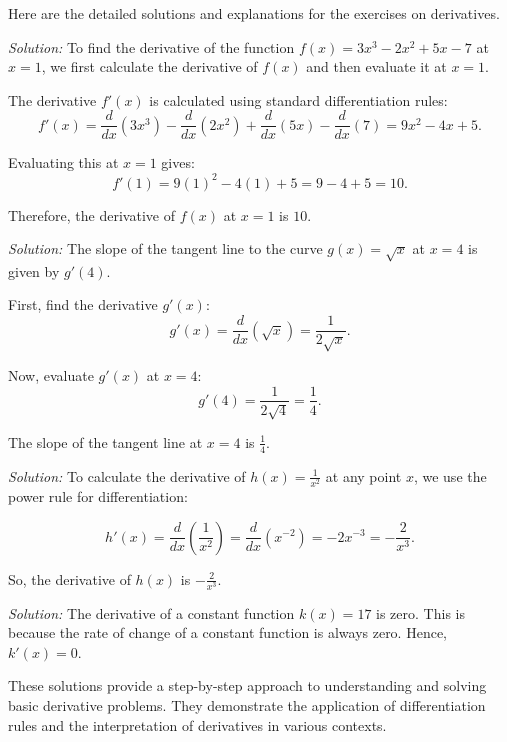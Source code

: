 \documentclass[a4paper,12pt]{book}
\newcounter{problem}
\newenvironment{solution}[1][]
{\par\noindent\textit{Solution:} \rmfamily}{\medskip}
\begin{document}
Here are the detailed solutions and explanations for the exercises on derivatives.

\begin{solution}[to Exercise 1]
To find the derivative of the function \( f(x) = 3x^3 - 2x^2 + 5x - 7 \) at \( x = 1 \), we first calculate the derivative of \( f(x) \) and then evaluate it at \( x = 1 \).

The derivative \( f'(x) \) is calculated using standard differentiation rules:
\[ f'(x) = \frac{d}{dx}(3x^3) - \frac{d}{dx}(2x^2) + \frac{d}{dx}(5x) - \frac{d}{dx}(7) = 9x^2 - 4x + 5. \]

Evaluating this at \( x = 1 \) gives:
\[ f'(1) = 9(1)^2 - 4(1) + 5 = 9 - 4 + 5 = 10. \]

Therefore, the derivative of \( f(x) \) at \( x = 1 \) is \( 10 \).
\end{solution}

\begin{solution}[to Exercise 2]
The slope of the tangent line to the curve \( g(x) = \sqrt{x} \) at \( x = 4 \) is given by \( g'(4) \).

First, find the derivative \( g'(x) \):
\[ g'(x) = \frac{d}{dx}(\sqrt{x}) = \frac{1}{2\sqrt{x}}. \]

Now, evaluate \( g'(x) \) at \( x = 4 \):
\[ g'(4) = \frac{1}{2\sqrt{4}} = \frac{1}{4}. \]

The slope of the tangent line at \( x = 4 \) is \( \frac{1}{4} \).
\end{solution}

\begin{solution}[to Exercise 3]
To calculate the derivative of \( h(x) = \frac{1}{x^2} \) at any point \( x \), we use the power rule for differentiation:

\[ h'(x) = \frac{d}{dx}\left(\frac{1}{x^2}\right) = \frac{d}{dx}(x^{-2}) = -2x^{-3} = -\frac{2}{x^3}. \]

So, the derivative of \( h(x) \) is \( -\frac{2}{x^3} \).
\end{solution}

\begin{solution}[to Exercise 4]
The derivative of a constant function \( k(x) = 17 \) is zero. This is because the rate of change of a constant function is always zero. Hence, \( k'(x) = 0 \).
\end{solution}

These solutions provide a step-by-step approach to understanding and solving basic derivative problems. They demonstrate the application of differentiation rules and the interpretation of derivatives in various contexts.
\end{document}
